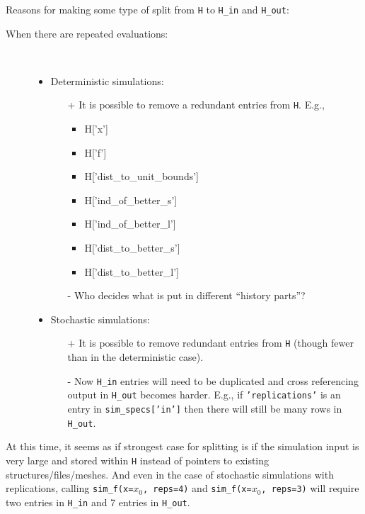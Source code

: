 \documentclass{article}
\newenvironment{allintypewriter}{\ttfamily}{\par}
\begin{document}
Reasons for making some type of split from \texttt{H} to \texttt{H\_in} and \texttt{H\_out}:
\begin{description}
  \item[When there are repeated evaluations:]\
    \begin{itemize}
      \item Deterministic simulations:
        \begin{itemize}
          \item[+] It is possible to remove a redundant entries from \texttt{H}. E.g.,
            \begin{allintypewriter}
              \begin{itemize}
                \item H['x']
                \item H['f']
                \item H['dist\_to\_unit\_bounds']
                \item H['ind\_of\_better\_s']
                \item H['ind\_of\_better\_l']
                \item H['dist\_to\_better\_s']
                \item H['dist\_to\_better\_l']
              \end{itemize}
            \end{allintypewriter}
          \item[-] Who decides what is put in different ``history parts''?
        \end{itemize}
      \item Stochastic simulations:
        \begin{itemize}
          \item[+] It is possible to remove redundant entries from \texttt{H}
            (though fewer than in the deterministic case).
          \item[-] Now \texttt{H\_in} entries will need to be duplicated and
            cross referencing output in \texttt{H\_out} becomes harder. E.g.,
            if \texttt{'replications'} is an entry in \texttt{sim\_specs['in']}
            then there will still be many rows in \texttt{H\_out}.
        \end{itemize}
    \end{itemize}
\end{description}

At this time, it seems as if strongest case for splitting is if the simulation
input is very large and stored within \texttt{H} instead of pointers to
existing structures/files/meshes. And even in the case of stochastic
simulations with replications, calling \texttt{sim\_f(x=$x_0$, reps=4)} and
\texttt{sim\_f(x=$x_0$, reps=3)} will require two entries in \texttt{H\_in} and
7 entries in \texttt{H\_out}.
\end{document}
